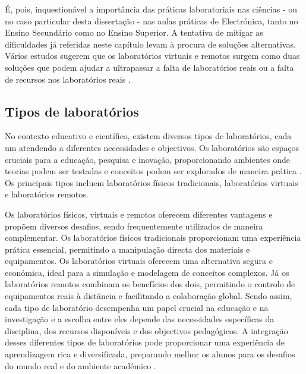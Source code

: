 É, pois, inquestionável a importância das práticas laboratoriais nas ciências - ou no caso particular desta dissertação - nas aulas práticas de Electrónica, tanto no Ensino Secundário como no Ensino Superior. A tentativa de mitigar as dificuldades já referidas neste capítulo levam à procura de soluções alternativas. Vários estudos sugerem que os laboratórios virtuais e remotos surgem como duas soluções que podem ajudar a ultrapassar a falta de laboratórios reais ou a falta de recursos nos laboratórios reais \cite{ImpactRemoteLabTeachingPractices, developremotelabs, HERADIO20161, POTKONJAK2016309}.


\subsection{Tipos de laboratórios} %
\label{sec:tiposlaboratorios}
No contexto educativo e científico, existem diversos tipos de laboratórios, cada um atendendo a diferentes necessidades e objectivos. Os laboratórios são espaços cruciais para a educação, pesquisa e inovação, proporcionando ambientes onde teorias podem ser testadas e conceitos podem ser explorados de maneira prática \cite{Hofsteinfoundations}. Os principais tipos incluem laboratórios físicos tradicionais, laboratórios virtuais e laboratórios remotos.

Os laboratórios físicos, virtuais e remotos oferecem diferentes vantagens e propõem diversos desafios, sendo frequentemente utilizados de maneira complementar. Os laboratórios físicos tradicionais proporcionam uma experiência prática essencial, permitindo a manipulação directa dos materiais e equipamentos. Os laboratórios virtuais oferecem uma alternativa segura e económica, ideal para a simulação e modelagem de conceitos complexos. Já os laboratórios remotos combinam os benefícios dos dois, permitindo o controlo de equipamentos reais à distância e facilitando a colaboração global. Sendo assim, cada tipo de laboratório desempenha um papel crucial na educação e na investigação e a escolha entre eles depende das necessidades específicas da disciplina, dos recursos disponíveis e dos objectivos pedagógicos. A integração desses diferentes tipos de laboratórios pode proporcionar uma experiência de aprendizagem rica e diversificada, preparando melhor os alunos para os desafios do mundo real e do ambiente académico \cite{BRINSON2015218, ImpactRemoteLabTeachingPractices, Hofsteinfoundations}.

